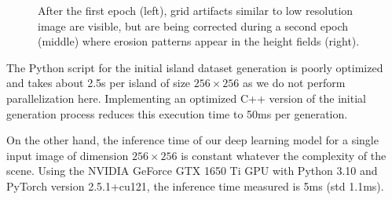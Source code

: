 \begin{figure}[t]
    \caption{After the first epoch (left), grid artifacts similar to low resolution image are visible, but are being corrected during a second epoch (middle) where erosion patterns appear in the height fields (right).}
    \label{fig:coral-island_first-epoch}
\end{figure}


The Python script for the initial island dataset generation is poorly optimized and takes about 2.5s per island of size $256 \times 256$ as we do not perform parallelization here. Implementing an optimized C++ version of the initial generation process reduces this execution time to 50ms per generation.

On the other hand, the inference time of our deep learning model for a single input image of dimension $256 \times 256$ is constant whatever the complexity of the scene. Using the NVIDIA GeForce GTX 1650 Ti GPU with Python 3.10 and PyTorch version 2.5.1+cu121, the inference time measured is 5ms (std 1.1ms). 

